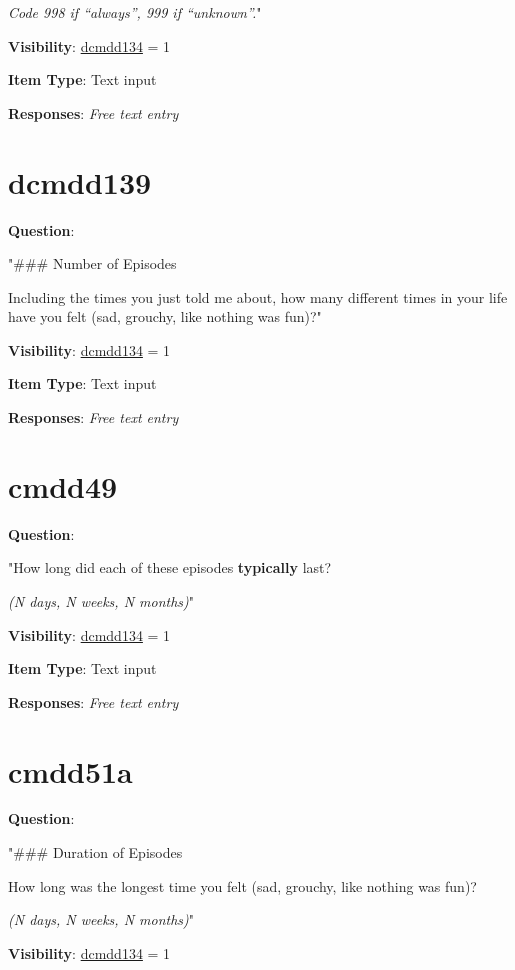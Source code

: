 \documentclass[
]{book}
\begin{document}
\emph{Code 998 if ``always'', 999 if ``unknown''.}"

\textbf{Visibility}: \protect\hyperlink{dcmdd134}{dcmdd134} = 1

\textbf{Item Type}: Text input

\textbf{Responses}: \emph{Free text entry}

\hypertarget{dcmdd139}{%
\section{dcmdd139}\label{dcmdd139}}

\textbf{Question}:

"\#\#\# Number of Episodes

Including the times you just told me about, how many different times in your life have you felt (sad, grouchy, like nothing was fun)?"

\textbf{Visibility}: \protect\hyperlink{dcmdd134}{dcmdd134} = 1

\textbf{Item Type}: Text input

\textbf{Responses}: \emph{Free text entry}

\hypertarget{cmdd49}{%
\section{cmdd49}\label{cmdd49}}

\textbf{Question}:

"How long did each of these episodes \textbf{typically} last?

\emph{(N days, N weeks, N months)}"

\textbf{Visibility}: \protect\hyperlink{dcmdd134}{dcmdd134} = 1

\textbf{Item Type}: Text input

\textbf{Responses}: \emph{Free text entry}

\hypertarget{cmdd51a}{%
\section{cmdd51a}\label{cmdd51a}}

\textbf{Question}:

"\#\#\# Duration of Episodes

How long was the longest time you felt (sad, grouchy, like nothing was fun)?

\emph{(N days, N weeks, N months)}"

\textbf{Visibility}: \protect\hyperlink{dcmdd134}{dcmdd134} = 1
\end{document}
